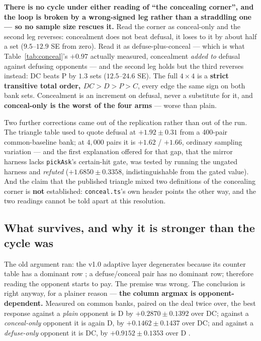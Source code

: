 \documentclass[11pt]{article}
\newcommand{\code}[1]{\texttt{#1}}
\begin{document}
\textbf{There is no cycle under either reading of ``the concealing corner'', and the loop is broken
by a wrong-signed leg rather than a straddling one --- so no sample size rescues it.} Read the
corner as conceal-only and the second leg reverses: concealment does not beat defusal, it loses to
it by about half a set ($9.5$--$12.9$ SE from zero). Read it as defuse-plus-conceal --- which is
what Table~\ref{tab:conceal}'s $+0.97$ actually measured, concealment \emph{added to} defusal
against defusing opponents --- and the second leg holds but the third reverses instead: DC beats P
by $1.3$ sets ($12.5$--$24.6$ SE). The full $4\times4$ is a \textbf{strict transitive total order,
$DC > D > P > C$}, every edge the same sign on both bank sets. Concealment is an increment on
defusal, never a substitute for it, and \textbf{conceal-only is the worst of the four arms} ---
worse than plain.

Two further corrections came out of the replication rather than out of the run. The triangle table
used to quote defusal at $+1.92 \pm 0.31$ from a 400-pair common-baseline bank; at $4{,}000$ pairs
it is $+1.62$ / $+1.66$, ordinary sampling variation --- and the first explanation offered for that
gap, that the mirror harness lacks \code{pickAsk}'s certain-hit gate, was tested by running the
ungated harness and \emph{refuted} ($+1.6850 \pm 0.3358$, indistinguishable from the gated value).
And the claim that the published triangle mixed two definitions of the concealing corner is
\textbf{not} established: \code{conceal.ts}'s own header points the other way, and the two readings
cannot be told apart at this resolution.

\subsection{What survives, and why it is stronger than the cycle was}
\label{sec:onebit}

The old argument ran: the v1.0 adaptive layer degenerates because its counter table has a dominant
row \cite{v10paper}; a defuse/conceal pair has no dominant row; therefore reading the opponent
starts to pay. The premise was wrong. The conclusion is right anyway, for a plainer reason ---
\textbf{the column argmax is opponent-dependent.} Measured on common banks, paired on the deal twice
over, the best response against a \emph{plain} opponent is D by $+0.2870 \pm 0.1392$ over DC;
against a \emph{conceal-only} opponent it is again D, by $+0.1462 \pm 0.1437$ over DC; and against a
\emph{defuse-only} opponent it is DC, by $+0.9152 \pm 0.1353$ over D \cite{concession}.
\end{document}
